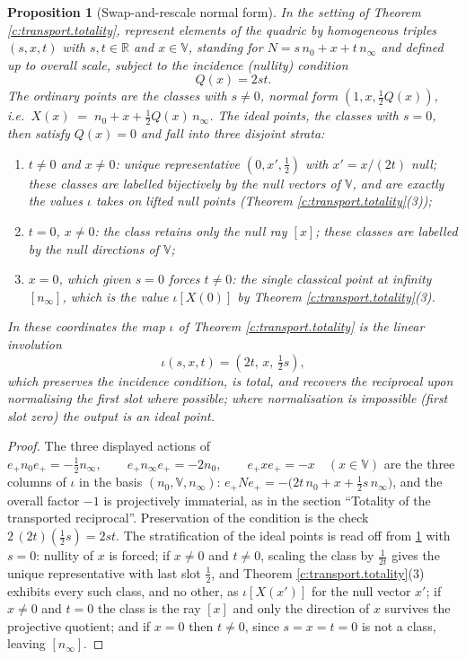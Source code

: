 \documentclass[11pt]{article}
\newtheorem{proposition}[theorem]{Proposition}
\theoremstyle{definition}
\theoremstyle{plain}
\providecommand{\R}{}\renewcommand{\R}{\mathbb{R}}
\providecommand{\nInf}{}\renewcommand{\nInf}{n_\infty}
\providecommand{\nO}{}\renewcommand{\nO}{n_0}
\begin{document}
\begin{proposition}[Swap-and-rescale normal form]\label{c:transport.swap-rescale-normal-form}
In the setting of Theorem \ref{c:transport.totality}, represent elements of the quadric by homogeneous triples $(s, x, t)$ with $s,t \in \R$ and $x \in \mathbb{V}$, standing for $N = s\,\nO + x + t\,\nInf$ and defined up to overall scale, subject to the incidence (nullity) condition
\begin{equation}
Q(x) = 2st .
\end{equation}
The ordinary points are the classes with $s \neq 0$, normal form $(1, x, \tfrac12 Q(x))$, i.e.\ $X(x) \;=\; \nO + x + \tfrac12 Q(x)\, \nInf$. The ideal points, the classes with $s = 0$, then satisfy $Q(x) = 0$ and fall into three disjoint strata:
\begin{enumerate}
\item[(i)] $t \neq 0$ and $x \neq 0$: unique representative $(0, x', \tfrac12)$ with $x' = x/(2t)$ null; these classes are labelled bijectively by the null \emph{vectors} of $\mathbb{V}$, and are exactly the values $\iota$ takes on lifted null points (Theorem \ref{c:transport.totality}(3));
\item[(ii)] $t = 0$, $x \neq 0$: the class retains only the null \emph{ray} $[x]$; these classes are labelled by the null directions of $\mathbb{V}$;
\item[(iii)] $x = 0$, which given $s = 0$ forces $t \neq 0$: the single classical point at infinity $[\nInf]$, which is the value $\iota[X(0)]$ by Theorem \ref{c:transport.totality}(3).
\end{enumerate}
In these coordinates the map $\iota$ of Theorem \ref{c:transport.totality} is the linear involution
\[
\iota(s, x, t) = (2t,\, x,\, \tfrac12 s),
\]
which preserves the incidence condition, is total, and recovers the reciprocal upon normalising the first slot where possible; where normalisation is impossible (first slot zero) the output is an ideal point.
\end{proposition}
\begin{proof}
The three displayed actions of $e_+ \nO e_+ = -\tfrac12 \nInf, \qquad e_+ \nInf e_+ = -2\nO, \qquad e_+ x e_+ = -x \quad (x \in \mathbb{V})$ are the three columns of $\iota$ in the basis $(\nO, \mathbb{V}, \nInf)$: $e_+ N e_+ = -\bigl(2t\,\nO + x + \tfrac12 s\,\nInf\bigr)$, and the overall factor $-1$ is projectively immaterial, as in the section ``Totality of the transported reciprocal''. Preservation of the condition is the check $2\,(2t)(\tfrac12 s) = 2st$. The stratification of the ideal points is read off from \ref{c:transport.swap-rescale-normal-form} with $s = 0$: nullity of $x$ is forced; if $x \neq 0$ and $t \neq 0$, scaling the class by $\tfrac{1}{2t}$ gives the unique representative with last slot $\tfrac12$, and Theorem \ref{c:transport.totality}(3) exhibits every such class, and no other, as $\iota[X(x')]$ for the null vector $x'$; if $x \neq 0$ and $t = 0$ the class is the ray $[x]$ and only the direction of $x$ survives the projective quotient; and if $x = 0$ then $t \neq 0$, since $s = x = t = 0$ is not a class, leaving $[\nInf]$.

\end{proof}
\end{document}
